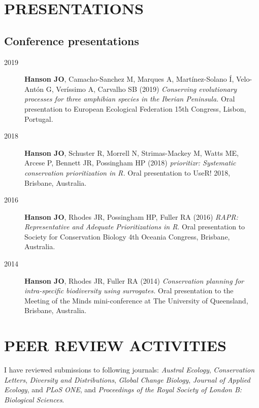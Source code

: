 \documentclass[12pt,a4paper]{article}
\begin{document}
\section*{PRESENTATIONS}
\subsection*{Conference presentations}
\begin{description}

\item[2019] \textbf{Hanson JO}, Camacho-Sanchez M, Marques A, Martínez-Solano Í, Velo-Antón G, Veríssimo A, Carvalho SB (2019) \textit{Conserving evolutionary processes for three amphibian species in the Iberian Peninsula.} Oral presentation to European Ecological Federation 15th Congress, Lisbon, Portugal.

\item[2018] \textbf{Hanson JO}, Schuster R, Morrell N, Strimas-Mackey M, Watts ME, Arcese P, Bennett JR, Possingham HP (2018) \textit{prioritizr: Systematic conservation prioritization in R.} Oral presentation to UseR! 2018, Brisbane, Australia.

\item[2016] \textbf{Hanson JO}, Rhodes JR, Possingham HP, Fuller RA (2016) \textit{RAPR: Representative and Adequate Prioritizations in R}. Oral presentation to Society for Conservation Biology 4th Oceania Congress, Brisbane, Australia.

\item[2014] \textbf{Hanson JO}, Rhodes JR, Fuller RA (2014) \textit{Conservation planning for intra-specific biodiversity using surrogates.} Oral presentation to the Meeting of the Minds mini-conference at The University of Queensland, Brisbane, Australia.

\end{description}

\clearpage

\section*{PEER REVIEW ACTIVITIES}

I have reviewed submissions to following journals: \textit{Austral Ecology}, \textit{Conservation Letters}, \textit{Diversity and Distributions}, \textit{Global Change Biology}, \textit{Journal of Applied Ecology}, and \textit{PLoS ONE}, and \textit{Proceedings of the Royal Society of London B: Biological Sciences}.
\end{document}
